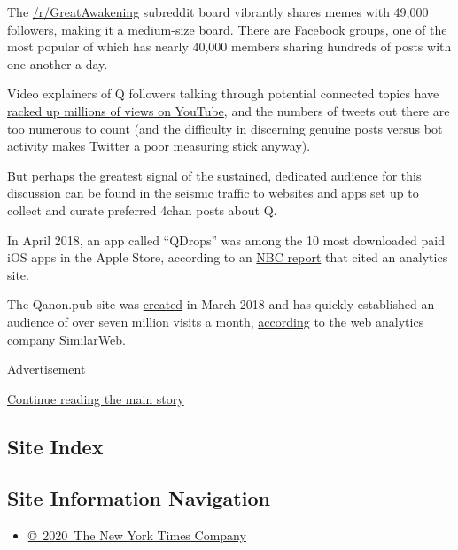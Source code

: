 The \href{https://www.reddit.com/r/greatawakening/}{/r/GreatAwakening}
subreddit board vibrantly shares memes with 49,000 followers, making it
a medium-size board. There are Facebook groups, one of the most popular
of which has nearly 40,000 members sharing hundreds of posts with one
another a day.

Video explainers of Q followers talking through potential connected
topics have
\href{https://www.youtube.com/results?search_query=qanon\&sp=CANCBAgBEgA\%253D}{racked
up millions of views on YouTube}, and the numbers of tweets out there
are too numerous to count (and the difficulty in discerning genuine
posts versus bot activity makes Twitter a poor measuring stick anyway).

But perhaps the greatest signal of the sustained, dedicated audience for
this discussion can be found in the seismic traffic to websites and apps
set up to collect and curate preferred 4chan posts about Q.

In April 2018, an app called ``QDrops'' was among the 10 most downloaded
paid iOS apps in the Apple Store, according to an
\href{https://www.nbcnews.com/tech/tech-news/exclusive-apple-google-cashed-pizzagate-offshoot-conspiracy-app-n891726}{NBC
report} that cited an analytics site.

The Qanon.pub site was
\href{https://www.whois.com/whois/qanon.pub}{created} in March 2018 and
has quickly established an audience of over seven million visits a
month,
\href{https://www.similarweb.com/website/qanon.pub\#overview}{according}
to the web analytics company SimilarWeb.

Advertisement

\protect\hyperlink{after-bottom}{Continue reading the main story}

\hypertarget{site-index}{%
\subsection{Site Index}\label{site-index}}

\hypertarget{site-information-navigation}{%
\subsection{Site Information
Navigation}\label{site-information-navigation}}

\begin{itemize}
\tightlist
\item
  \href{https://help.nytimes.com/hc/en-us/articles/115014792127-Copyright-notice}{©~2020~The
  New York Times Company}
\end{itemize}

